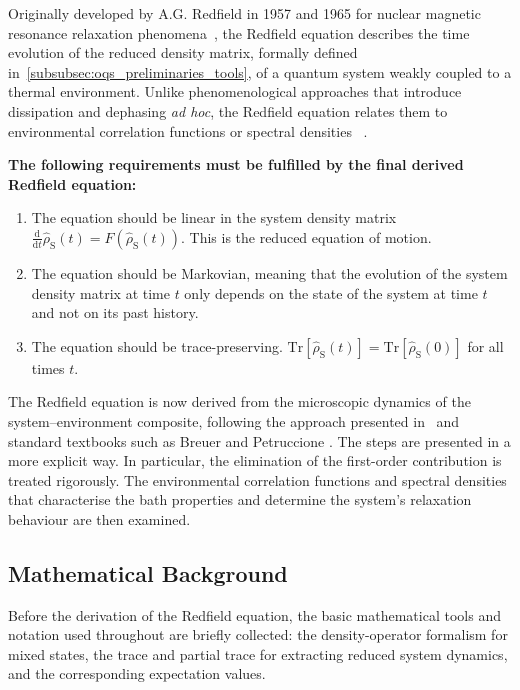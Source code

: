 Originally developed by A.G. Redfield in 1957 and 1965 for nuclear magnetic resonance relaxation phenomena~\cite{redfield1965theoryrelaxationprocesses}, the Redfield equation describes the time evolution of the reduced density matrix, formally defined in~\autoref{subsubsec:oqs_preliminaries_tools}, of a quantum system weakly coupled to a thermal environment.
Unlike phenomenological approaches that introduce dissipation and dephasing \emph{ad hoc}, the Redfield equation relates them to environmental correlation functions or spectral densities ~\cite{lindblad1976generatorsquantumdynamical, breuerpetruccione2007theoryopenquantum, weiss2012quantumdissipativesystems}.

\textbf{The following requirements must be fulfilled by the final derived Redfield equation:}

\begin{enumerate}
	\item The equation should be linear in the system density matrix $\frac{\mathrm{d}}{\mathrm{d}t}\hat{\rho}_{\mathrm{S}}(t) = F(\hat{\rho}_{\mathrm{S}}(t))$. This is the reduced equation of motion.
	\item The equation should be Markovian, meaning that the evolution of the system density matrix  at time $t$ only depends on the state of the system at time $t$ and not on its past history.
	\item The equation should be trace-preserving. $\mathrm{Tr}[\hat{\rho}_{\mathrm{S}}(t)] = \mathrm{Tr}[\hat{\rho}_{\mathrm{S}}(0)]$ for all times $t$.
\end{enumerate}

The Redfield equation is now derived from the microscopic dynamics of the system--environment composite, following the approach presented in~\cite{manzano2020shortintroductionlindblad} and standard textbooks such as Breuer and Petruccione \cite{breuerpetruccione2007theoryopenquantum}. The steps are presented in a more explicit way. In particular, the elimination of the first-order contribution is treated rigorously. The environmental correlation functions and spectral densities that characterise the bath properties and determine the system's relaxation behaviour are then examined.


\subsection{Mathematical Background}
\label{subsubsec:oqs_preliminaries_tools}

Before the derivation of the Redfield equation, the basic mathematical tools and notation used throughout are briefly collected: the density-operator formalism for mixed states, the trace and partial trace for extracting reduced system dynamics, and the corresponding expectation values. 


